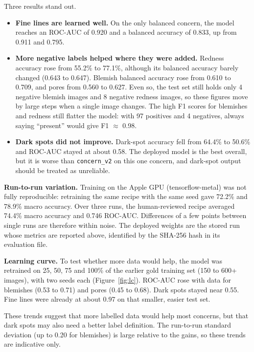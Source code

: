 Three results stand out.
\begin{itemize}
  \item \textbf{Fine lines are learned well.} On the only balanced concern, the model reaches an ROC-AUC of 0.920 and a balanced accuracy of 0.833, up from 0.911 and 0.795.
  \item \textbf{More negative labels helped where they were added.} Redness accuracy rose from 55.2\% to 77.1\%, although its balanced accuracy barely changed (0.643 to 0.647). Blemish balanced accuracy rose from 0.610 to 0.709, and pores from 0.560 to 0.627. Even so, the test set still holds only 4 negative blemish images and 8 negative redness images, so these figures move by large steps when a single image changes. The high F1 scores for blemishes and redness still flatter the model: with 97 positives and 4 negatives, always saying ``present'' would give F1 $\approx$ 0.98.
  \item \textbf{Dark spots did not improve.} Dark-spot accuracy fell from 64.4\% to 50.6\% and ROC-AUC stayed at about 0.58. The deployed model is the best overall, but it is worse than \texttt{concern\_v2} on this one concern, and dark-spot output should be treated as unreliable.
\end{itemize}

\textbf{Run-to-run variation.} Training on the Apple GPU (tensorflow-metal) was not fully reproducible: retraining the same recipe with the same seed gave 72.2\% and 78.9\% macro accuracy. Over three runs, the human-reviewed recipe averaged 74.4\% macro accuracy and 0.746 ROC-AUC. Differences of a few points between single runs are therefore within noise. The deployed weights are the stored run whose metrics are reported above, identified by the SHA-256 hash in its evaluation file.

\textbf{Learning curve.} To test whether more data would help, the model was retrained on 25, 50, 75 and 100\% of the earlier gold training set (150 to 600+ images), with two seeds each (Figure~\ref{fig:lc}). ROC-AUC rose with data for blemishes (0.53 to 0.71) and pores (0.45 to 0.68). Dark spots stayed near 0.55. Fine lines were already at about 0.97 on that smaller, easier test set.

These trends suggest that more labelled data would help most concerns, but that dark spots may also need a better label definition. The run-to-run standard deviation (up to 0.20 for blemishes) is large relative to the gains, so these trends are indicative only.

